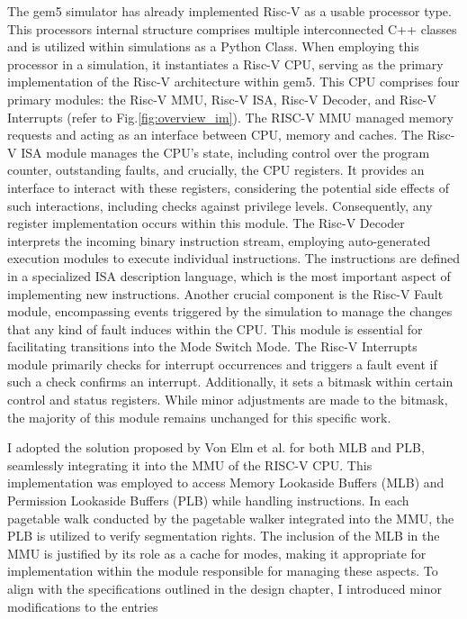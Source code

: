 The gem5 simulator has already implemented Risc-V as a usable processor type.
This processors internal structure comprises multiple interconnected C++ classes
and is utilized within simulations as a Python Class. When employing
this processor in a simulation, it instantiates a Risc-V CPU, serving as the
primary implementation of the Risc-V architecture within gem5. This CPU
comprises four primary modules: the Risc-V MMU, Risc-V ISA, Risc-V Decoder, and
Risc-V Interrupts (refer to Fig.\ref{fig:overview_im}). The RISC-V MMU managed
memory requests and acting as an interface between CPU, memory and caches.
The Risc-V ISA module manages the CPU's state, including control over the
program counter, outstanding faults, and crucially, the CPU registers. It
provides an interface to interact with these registers, considering the
potential side effects of such interactions, including checks against privilege
levels. Consequently, any register implementation occurs within this module. The
Risc-V Decoder interprets the incoming binary instruction stream, employing
auto-generated execution modules to execute individual instructions. The
instructions are defined in a specialized ISA description language,
which is the most important aspect of implementing new instructions.
Another crucial component is the Risc-V Fault module, encompassing events triggered by
the simulation to manage the changes that any kind of fault induces
within the CPU. This module is essential for facilitating transitions into the
Mode Switch Mode. The Risc-V Interrupts module primarily checks for interrupt occurrences and
triggers a fault event if such a check confirms an interrupt. Additionally, it
sets a bitmask within certain control and status registers. While minor
adjustments are made to the bitmask, the majority of this module remains
unchanged for this specific work.\par
I adopted the solution proposed by Von Elm et al.\cite{Cve} for both MLB and PLB,
seamlessly integrating it into the MMU of the RISC-V CPU. This implementation
was employed to access Memory Lookaside Buffers (MLB) and Permission Lookaside
Buffers (PLB) while handling instructions. In each pagetable walk conducted by
the pagetable walker integrated into the MMU, the PLB is utilized to verify
segmentation rights. The inclusion of the MLB in the MMU is justified by its
role as a cache for modes, making it appropriate for implementation within the
module responsible for managing these aspects. To align with the specifications
outlined in the design chapter, I introduced minor modifications to the entries
